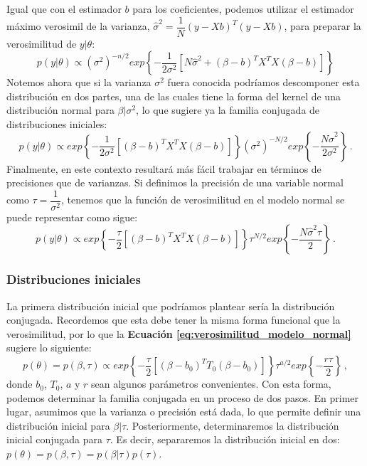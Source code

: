Igual que con el estimador $b$ para los coeficientes, podemos utilizar el estimador máximo verosimil de la varianza, $\hat{\sigma}^2=\dfrac{1}{N}(y-Xb)^T(y-Xb)$, para preparar la verosimilitud de $y|\theta$:
\begin{equation*}
p(y|\theta) \propto (\sigma^2)^{-n/2}exp\left\lbrace -\dfrac{1}{2\sigma^2}\left[N\hat{\sigma}^2 + (\beta-b)^TX^TX(\beta-b)\right] \right\rbrace
\end{equation*}
Notemos ahora que si la varianza $\sigma^2$ fuera conocida podríamos descomponer esta distribución en dos partes, una de las cuales tiene la forma del kernel de una distribución normal para $\beta|\sigma^2$, lo que sugiere ya la familia conjugada de distribuciones iniciales:
\begin{equation*}
p(y|\theta) \propto exp\left\lbrace -\dfrac{1}{2\sigma^2}\left[(\beta-b)^TX^TX(\beta-b)\right] \right\rbrace (\sigma^2)^{-N/2} exp\left\lbrace -\dfrac{N\hat{\sigma}^2}{2\sigma^2}\right\rbrace \,.
\end{equation*}
Finalmente, en este contexto resultará más fácil trabajar en términos de precisiones que de varianzas. Si definimos la precisión de una variable normal como $\tau=\dfrac{1}{\sigma^2}$, tenemos que la función de verosimilitud en el modelo normal se puede representar como sigue: 
\begin{equation} \label{eq:verosimilitud_modelo_normal}
p(y|\theta) \propto exp\left\lbrace -\dfrac{\tau}{2}\left[(\beta-b)^TX^TX(\beta-b)\right] \right\rbrace \tau^{N/2}exp\left\lbrace -\dfrac{N\hat{\sigma}^2\tau}{2}\right\rbrace \,.
\end{equation}

\subsubsection*{Distribuciones iniciales}

La primera distribución inicial que podríamos plantear sería la distribución conjugada. Recordemos que esta debe tener la misma forma funcional que la verosimilitud, por lo que la \textbf{Ecuación \ref{eq:verosimilitud_modelo_normal}} sugiere lo siguiente: 
\begin{equation*}
p(\theta)= p(\beta,\tau) \propto exp\left\lbrace -\dfrac{\tau}{2}\left[(\beta-b_0)^TT_0(\beta-b_0)\right] \right\rbrace \tau^{a/2} exp\left\lbrace -\dfrac{r\tau}{2}\right\rbrace \,,
\end{equation*}
donde $b_0$, $T_0$, $a$ y $r$ sean algunos parámetros convenientes. Con esta forma, podemos determinar la familia conjugada en un proceso de dos pasos. En primer lugar, asumimos que la varianza o precisión está dada, lo que permite definir una distribución inicial para $\beta|\tau$. Posteriormente, determinaremos la distribución inicial conjugada para $\tau$. Es decir, separaremos la distribución inicial en dos: $p(\theta)=p(\beta,\tau)=p(\beta|\tau)p(\tau)$.\\ 

